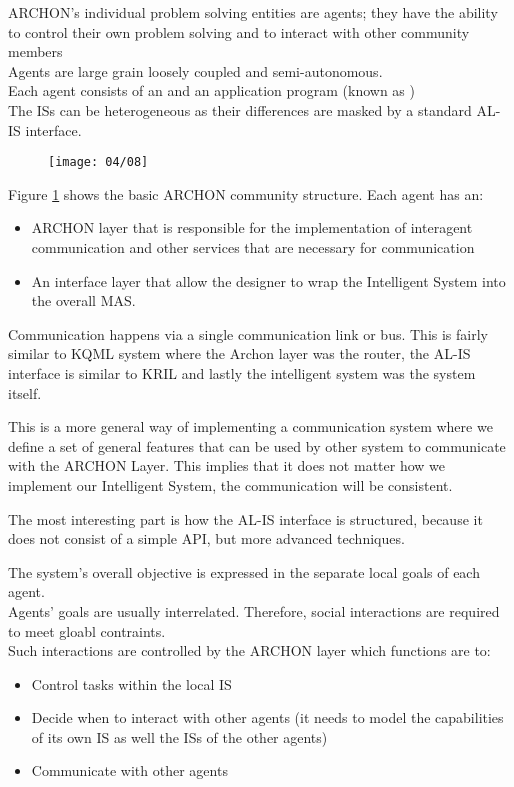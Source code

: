 ARCHON's individual problem solving entities are agents; they have the ability to control their own problem solving and to interact with other community members\\
Agents are large grain loosely coupled and semi-autonomous.\\
Each agent consists of an  and an application program (known as )\\
The ISs can be heterogeneous as their differences are masked by a standard AL-IS interface.\\

\begin{figure}[!h]
\centering
\texttt{[image: 04/08]}
\caption{}
\label{fig:archoncommunity}
\end{figure}

Figure \ref{fig:archoncommunity} shows the basic ARCHON community structure. Each agent has an:
\begin{itemize}
\item ARCHON layer that is responsible for the implementation of interagent communication and other services that are necessary for communication
\item An interface layer that allow the designer to wrap the Intelligent System into the overall MAS.
\end{itemize}
Communication happens via a single communication link or bus. This is fairly similar to KQML system where the Archon layer was the router, the AL-IS interface is similar to KRIL and lastly the intelligent system was the system itself.

This is a more general way of implementing a communication system where we define a set of general features that can be used by other system to communicate with the ARCHON Layer. This implies that it does not matter how we implement our Intelligent System, the communication will be consistent.

The most interesting part is how the AL-IS interface is structured, because it does not consist of a simple API, but more advanced techniques.

The system's overall objective is expressed in the separate local goals of each agent.\\
Agents' goals are usually interrelated. Therefore, social interactions are required to meet gloabl contraints.\\
Such interactions are controlled by the ARCHON layer which functions are to:
\begin{itemize}
\item Control tasks within the local IS
\item Decide when to interact with other agents (it needs to model the capabilities of its own IS as well the ISs of the other agents)
\item Communicate with other agents
\end{itemize}

